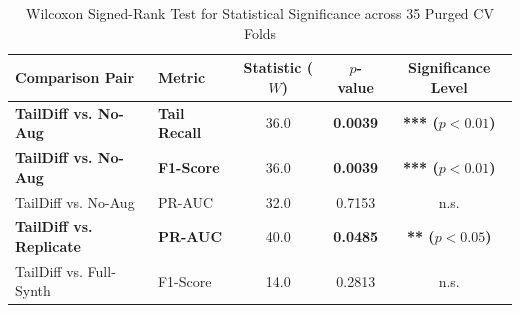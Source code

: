 \begin{table}[htbp]
\centering
\caption{Wilcoxon Signed-Rank Test for Statistical Significance across 35 Purged CV Folds}
\label{tab:wilcoxon}
\begin{tabular}{llccc}
\hline
\textbf{Comparison Pair} & \textbf{Metric} & \textbf{Statistic ($W$)} & \textbf{$p$-value} & \textbf{Significance Level} \\ \hline
\textbf{TailDiff vs. No-Aug} & \textbf{Tail Recall} & 36.0 & \textbf{0.0039} & \textbf{*** ($p < 0.01$)} \\
\textbf{TailDiff vs. No-Aug} & \textbf{F1-Score} & 36.0 & \textbf{0.0039} & \textbf{*** ($p < 0.01$)} \\
TailDiff vs. No-Aug & PR-AUC & 32.0 & 0.7153 & n.s. \\
\textbf{TailDiff vs. Replicate} & \textbf{PR-AUC} & 40.0 & \textbf{0.0485} & \textbf{** ($p < 0.05$)} \\
TailDiff vs. Full-Synth & F1-Score & 14.0 & 0.2813 & n.s. \\ \hline
\end{tabular}
\end{table}
